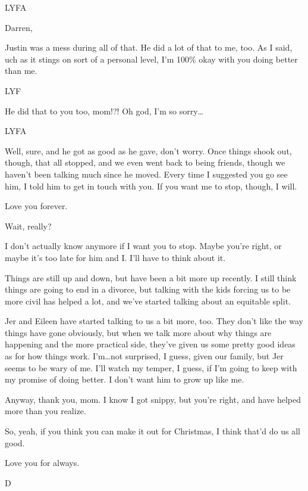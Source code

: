 LYFA

\secdiv{}\newpage

Darren,

Justin was a mess during all of that. He did a lot of that to me, too. As I said, uch as it stings on sort of a personal level, I'm 100\% okay with you doing better than me.

LYF

\secdiv{}

He did that to you too, mom!?! Oh god, I'm so sorry\ldots{}

LYFA

\secdiv{}

Well, sure, and he got as good as he gave, don't worry. Once things shook out, though, that all stopped, and we even went back to being friends, though we haven't been talking much since he moved. Every time I suggested you go see him, I told him to get in touch with you. If you want me to stop, though, I will.

Love you forever.

\secdiv{}

Wait, really?

I don't actually know anymore if I want you to stop. Maybe you're right, or maybe it's too late for him and I. I'll have to think about it.

Things are still up and down, but have been a bit more up recently. I still think things are going to end in a divorce, but talking with the kids forcing us to be more civil has helped a lot, and we've started talking about an equitable split.\newpage

Jer and Eileen have started talking to us a bit more, too. They don't like the way things have gone obviously, but when we talk more about why things are happening and the more practical side, they've given us some pretty good ideas as for how things work. I'm\ldots{}not surprised, I guess, given our family, but Jer seems to be wary of me. I'll watch my temper, I guess, if I'm going to keep with my promise of doing better. I don't want him to grow up like me.

Anyway, thank you, mom. I know I got snippy, but you're right, and have helped more than you realize.

So, yeah, if you think you can make it out for Christmas, I think that'd do us all good.

Love you for always.

D
